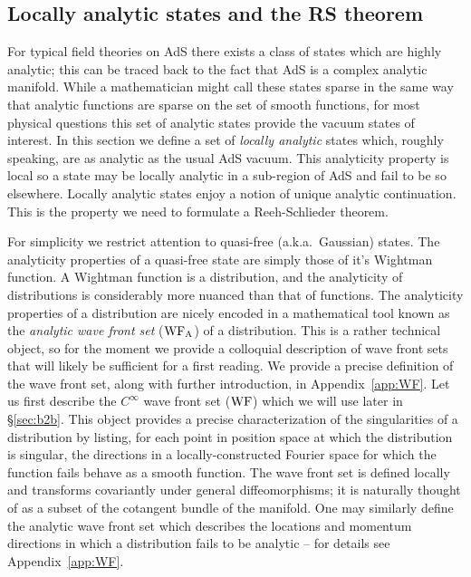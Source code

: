 \documentclass[12pt,a4paper]{article}
\numberwithin{equation}{section}
\def\WF{{\rm WF}}
\def\WFA{{\rm WF}_{\rm A}}
\begin{document}
\subsection{Locally analytic states and the RS theorem}
\label{sec:RS}


For typical field theories on AdS there exists a class of
states which are highly analytic; this can be traced back to the
fact that AdS is a complex analytic manifold.
While a mathematician might call these states sparse in the same
way that analytic functions are sparse on the set of smooth functions,
for most physical questions this set of analytic states provide
the vacuum states of interest. In this section we define a set 
of \emph{locally analytic} states which, roughly speaking, are 
as analytic as the usual AdS vacuum.
This analyticity property is local so a
state may be locally analytic in a sub-region of AdS and fail
to be so elsewhere.
Locally analytic states enjoy a notion of unique analytic 
continuation. This is the property we need to formulate a
Reeh-Schlieder theorem.


For simplicity we restrict attention to quasi-free (a.k.a.~Gaussian)
states. The analyticity properties of a quasi-free state are simply
those of it's Wightman function. A Wightman function is a distribution,
and the analyticity of distributions is considerably more nuanced than 
that of functions. 
The analyticity properties of a distribution are nicely encoded
in a mathematical tool known as the \emph{analytic wave front 
set} ($\WFA$) of a distribution. This is a rather technical
object, so for the moment we provide a colloquial description of 
wave front sets that will likely be sufficient for a first reading. 
We provide a precise definition of the wave front set, along with 
further introduction, in Appendix~\ref{app:WF}.
Let us first describe the $C^\infty$ wave front set ($\WF$)
which we will use later in \S\ref{sec:b2b}.
This object provides a precise characterization of the singularities
of a distribution by listing, for each point in position space at which the
distribution is singular, the directions in a locally-constructed
Fourier space for which the function fails behave as a smooth function.
The wave front set is defined locally and transforms covariantly
under general diffeomorphisms; it is naturally thought of 
as a subset of the cotangent bundle of the manifold.
One may similarly define the analytic wave front set 
which describes the locations and momentum directions in which
a distribution fails to be analytic -- for details see
Appendix~\ref{app:WF}.
\end{document}

